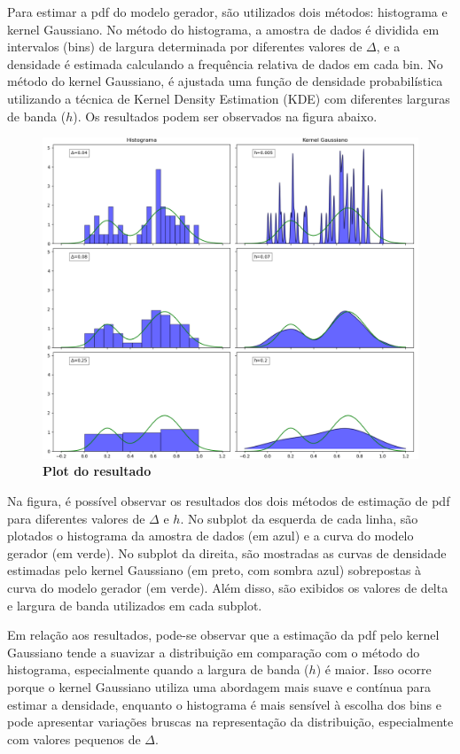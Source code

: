 \begin{enumerate}[label=E\arabic*]
Para estimar a pdf do modelo gerador, são utilizados dois métodos: histograma e kernel Gaussiano. No método do histograma, a amostra de dados é dividida em intervalos (bins) de largura determinada por diferentes valores de $\Delta$, e a densidade é estimada calculando a frequência relativa de dados em cada bin. No método do kernel Gaussiano, é ajustada uma função de densidade probabilística utilizando a técnica de Kernel Density Estimation (KDE) com diferentes larguras de banda ($h$). Os resultados podem ser observados na figura abaixo.

\begin{figure}[H]
    \caption{\textbf{Plot do resultado}}
       \centering
       \includegraphics[width=\textwidth]{ex4.png}
\end{figure}

Na figura, é possível observar os resultados dos dois métodos de estimação de pdf para diferentes valores de $\Delta$ e $h$. No subplot da esquerda de cada linha, são plotados o histograma da amostra de dados (em azul) e a curva do modelo gerador (em verde). No subplot da direita, são mostradas as curvas de densidade estimadas pelo kernel Gaussiano (em preto, com sombra azul) sobrepostas à curva do modelo gerador (em verde). Além disso, são exibidos os valores de delta e largura de banda utilizados em cada subplot.

Em relação aos resultados, pode-se observar que a estimação da pdf pelo kernel Gaussiano tende a suavizar a distribuição em comparação com o método do histograma, especialmente quando a largura de banda ($h$) é maior. Isso ocorre porque o kernel Gaussiano utiliza uma abordagem mais suave e contínua para estimar a densidade, enquanto o histograma é mais sensível à escolha dos bins e pode apresentar variações bruscas na representação da distribuição, especialmente com valores pequenos de $\Delta$.



\end{enumerate}
